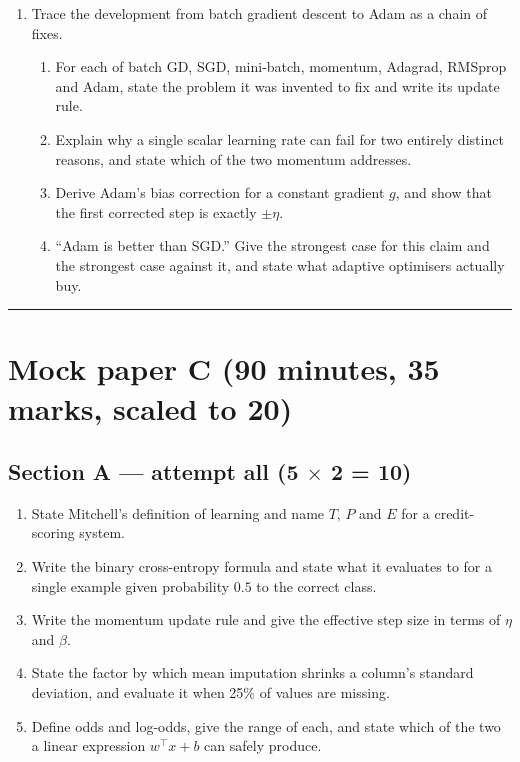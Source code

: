 \documentclass[11pt,a4paper]{article}
\begin{document}
\begin{enumerate}[label=\textbf{\arabic*.}, leftmargin=*, start=10]
\item Trace the development from batch gradient descent to Adam as a chain of
  fixes.
  \begin{enumerate}[label=(\alph*)]
    \item For each of batch GD, SGD, mini-batch, momentum, Adagrad, RMSprop and
      Adam, state the problem it was invented to fix and write its update rule.
    \item Explain why a single scalar learning rate can fail for two entirely
      distinct reasons, and state which of the two momentum addresses.
    \item Derive Adam's bias correction for a constant gradient $g$, and show
      that the first corrected step is exactly $\pm\eta$. 
    \item ``Adam is better than SGD.'' Give the strongest case for this claim
      and the strongest case against it, and state what adaptive optimisers
      actually buy. 
  \end{enumerate}
\end{enumerate}

\vspace{0.4em}\hrule\vspace{0.4em}

\section*{Mock paper C \quad (90 minutes, 35 marks, scaled to 20)}

\subsection*{Section A --- attempt all \quad (5 $\times$ 2 = 10)}

\begin{enumerate}[label=\textbf{\arabic*.}, leftmargin=*]
\item State Mitchell's definition of learning and name $T$, $P$ and $E$ for a
  credit-scoring system. 
\item Write the binary cross-entropy formula and state what it evaluates to for
  a single example given probability $0.5$ to the correct class. 
\item Write the momentum update rule and give the effective step size in terms
  of $\eta$ and $\beta$. 
\item State the factor by which mean imputation shrinks a column's standard
  deviation, and evaluate it when 25\% of values are missing. 
\item Define odds and log-odds, give the range of each, and state which of the
  two a linear expression $w^\top x + b$ can safely produce. 
\end{enumerate}
\end{document}
